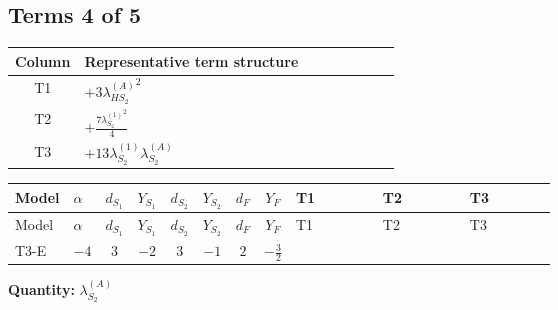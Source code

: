 \documentclass[8pt]{article}
\begin{document}
\begin{landscape}
\subsection*{Terms 4 of 5}
\begin{center}
\begin{tabular}{@{}c >{\raggedright\arraybackslash}p{0.82\linewidth}@{}}
\toprule
Column & Representative term structure \\
\midrule
T1 & \(\displaystyle +3 {\lambda_{HS_2}^{(A)}}^2\) \\
\midrule
T2 & \(\displaystyle +\frac{7 {\lambda_{S_2}^{(1)}}^2}{4}\) \\
\midrule
T3 & \(\displaystyle +13 {\lambda_{S_2}^{(1)}} {\lambda_{S_2}^{(A)}}\) \\
\midrule
\bottomrule
\end{tabular}
\end{center}
\smallskip
\tiny
\begin{longtable}{@{}llcccccc >{\raggedright\arraybackslash}p{0.21\linewidth} >{\raggedright\arraybackslash}p{0.21\linewidth} >{\raggedright\arraybackslash}p{0.21\linewidth}@{}}
\toprule
Model & $\alpha$ & $d_{S_1}$ & $Y_{S_1}$ & $d_{S_2}$ & $Y_{S_2}$ & $d_F$ & $Y_F$ & T1 & T2 & T3 \\
\midrule
\endfirsthead
\toprule
Model & $\alpha$ & $d_{S_1}$ & $Y_{S_1}$ & $d_{S_2}$ & $Y_{S_2}$ & $d_F$ & $Y_F$ & T1 & T2 & T3 \\
\midrule
\endhead
T3-E & $-4$ & $3$ & $-2$ & $3$ & $-1$ & $2$ & $-\frac{3}{2}$ & \scriptsize\adjustbox{max width=\linewidth}{$\begin{gathered} +3 {\lambda_{HS_2}^{(A)}}^2\end{gathered}$} & \scriptsize\adjustbox{max width=\linewidth}{$\begin{gathered} +\frac{7 {\lambda_{S_2}^{(1)}}^2}{4}\end{gathered}$} & \scriptsize\adjustbox{max width=\linewidth}{$\begin{gathered} +13 {\lambda_{S_2}^{(1)}} {\lambda_{S_2}^{(A)}}\end{gathered}$} \\
\midrule
\bottomrule
\end{longtable}
\clearpage
\noindent\textbf{Quantity: }$\lambda_{S_2}^{(A)}$\par\smallskip

\end{landscape}
\end{document}
